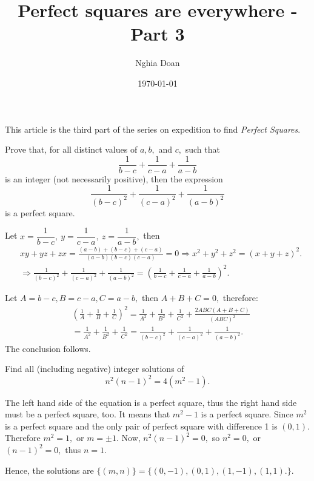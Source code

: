 \documentclass{article}
\title{Perfect squares are everywhere - Part 3}
\author{Nghia Doan}
\date{\today}
\begin{document}
\maketitle

This article is the third part of the series on expedition to find \textit{Perfect Squares}.

\begin{example*}[Example 11]
    Prove that, for all distinct values of $a, b,$ and $c,$ such that 
    \[
        \frac{1}{b-c} + \frac{1}{c-a} + \frac{1}{a-b}
    \]
    is an integer (not necessarily positive), then the expression
    \[
        \frac{1}{(b-c)^2} + \frac{1}{(c-a)^2} + \frac{1}{(a-b)^2}
    \]
    is a perfect square.
\end{example*}

\begin{soln}[Solution 1]
    Let $x = \dfrac{1}{b-c},\ y = \dfrac{1}{c-a},\ z = \dfrac{1}{a-b},$ then
    \[
        \begin{aligned}
            &xy + yz + zx = \frac{(a-b)+(b-c)+(c-a)}{(a-b)(b-c)(c-a)} =0
            \Rightarrow x^2 + y^2 + z^2 = (x+y+z)^2.\\
            &\Rightarrow \frac{1}{(b-c)^2} + \frac{1}{(c-a)^2} + \frac{1}{(a-b)^2} = \boxed{\left(\frac{1}{b-c} + \frac{1}{c-a} + \frac{1}{a-b}\right)^2.}
        \end{aligned}
    \]
\end{soln}

\begin{soln}[Solution 2]
    Let $A = b-c, B= c-a, C=a-b,$ then $A+B+C=0,$ therefore:
    \[
        \begin{aligned}
            &\left(\frac{1}{A} + \frac{1}{B} +\frac{1}{C} \right)^2 = \frac{1}{A^2} + \frac{1}{B^2} +\frac{1}{C^2} + \frac{2ABC(A+B+C)}{(ABC)^2}\\
            &= \frac{1}{A^2} + \frac{1}{B^2} +\frac{1}{C^2} = \frac{1}{(b-c)^2} + \frac{1}{(c-a)^2} + \frac{1}{(a-b)^2}.
        \end{aligned}
    \]
    The conclusion follows.
\end{soln}

\newpage

\begin{example*}[Example 12]
    Find all (including negative) integer solutions of 
    \[
        n^2(n-1)^2=4(m^2-1).
    \]
\end{example*}

\begin{soln}[Solution 1]
    The left hand side of the equation is a perfect square, thus the right hand side must be a perfect square, too.
    It means that $m^2 - 1$ is a perfect square. Since $m^2$ is a perfect square and the only pair of perfect square with difference 1 is $(0,1).$
    Therefore $m^2=1,$ or $m= \pm 1.$
    Now, $n^2(n-1)^2 = 0,$ so $n^2 = 0,$ or $(n -1)^2 = 0,$ thus $n = 1.$

    Hence, the solutions are $\boxed{\{ (m,n) \} = \{(0, -1), (0, 1), (1, -1), (1, 1).\}.}$
\end{soln}
\end{document}
